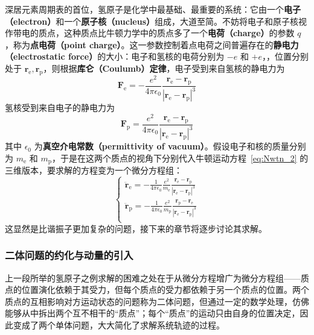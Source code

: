 \documentclass[cn,10pt,math=newtx,citestyle=gb7714-2015,bibstyle=gb7714-2015]{elegantbook}
\def\bm{\boldsymbol}
\begin{document}
\begin{instance}[两个带电质点]
    深居元素周期表的首位，氢原子是化学中最基础、最重要的系统：它由一个\textbf{电子（electron）}和一个\textbf{原子核（nucleus）}组成，大道至简。不妨将电子和原子核视作带电的质点，这种质点比牛顿力学中的质点多了一个\textbf{电荷（charge）}的参数 $q$，称为\textbf{点电荷（point charge）}。这一参数控制着点电荷之间普遍存在的\textbf{静电力（electrostatic force）}的大小：电子和氢核的电荷分别为 $-e$ 和 $+e$，，位置分别处于 $\bm r_\text{e},\bm r_\text{p}$，则根据\textbf{库仑（Coulumb）定律}，电子受到来自氢核的静电力为
    \begin{equation*}
        \bm F_\text{e} = -\frac{e^2}{4\pi\epsilon_0}\frac{\bm r_\text{e}-\bm r_\text{p}}{\left|\bm r_\text{e}-\bm r_\text{p}\right|^3}
    \end{equation*}
    氢核受到来自电子的静电力为
    \begin{equation*}
        \bm F_\text{p} = \frac{e^2}{4\pi\epsilon_0}\frac{\bm r_\text{e}-\bm r_\text{p}}{\left|\bm r_\text{e}-\bm r_\text{p}\right|^3}
    \end{equation*}
    其中 $\epsilon_0$ 为\textbf{真空介电常数（permittivity of vacuum）}。假设电子和核的质量分别为 $m_\text{e}$ 和 $m_\text{p}$，于是在这两个质点的视角下分别代入牛顿运动方程~\ref{eq:Nwtn_2} 的三维版本，要求解的方程变为一个微分方程组：
    \begin{equation}\label{eq:H_pnt_chrg}
        \begin{cases}
            \ddot{\bm r}_\text{e} = -\frac{1}{4\pi\epsilon_0}\frac{e^2}{m_\text{e}}\frac{\bm r_\text{e}-\bm r_\text{p}}{\left|\bm r_\text{e}-\bm r_\text{p}\right|^3}\\
            \ddot{\bm r}_\text{p} = -\frac{1}{4\pi\epsilon_0}\frac{e^2}{m_\text{p}}\frac{\bm r_\text{p}-\bm r_\text{e}}{\left|\bm r_\text{e}-\bm r_\text{p}\right|^3}\\
        \end{cases}
    \end{equation}
    这显然是比谐振子更加复杂的问题，接下来的章节将逐步讨论其求解。
\end{instance}

\subsubsection{二体问题的约化与动量的引入}
上一段所举的氢原子之例求解的困难之处在于从微分方程增广为微分方程组——质点的位置演化依赖于其受力，但每个质点的受力都依赖于另一个质点的位置。两个质点的互相影响对方运动状态的问题称为二体问题，但通过一定的数学处理，仿佛能够从中拆出两个互不相干的“质点”；每个“质点”的运动只由自身的位置决定，因此变成了两个单体问题，大大简化了求解系统轨迹的过程。
\end{document}
